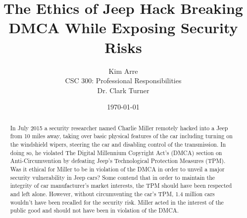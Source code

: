\documentclass[12pt]{article}
\begin{document}

\title{\vfill The Ethics of Jeep Hack Breaking DMCA While Exposing Security Risks} %
\author{
  Kim Arre \vspace{10pt} \\
  CSC 300: Professional Responsibilities  \vspace{10pt} \\
  Dr. Clark Turner \vspace{10pt} \\
}
\date{\today}

\maketitle

\vfill  %
\begin{abstract}
In July 2015 a security researcher named Charlie Miller remotely hacked into a Jeep from 10 miles away, taking over basic physical features of the car including turning on the windshield wipers, steering the car and disabling control of the transmission. In doing so, he violated The Digital Millennium Copyright Act's (DMCA) section on Anti-Circumvention by defeating Jeep's Technological Protection Measures (TPM). Was it ethical for Miller to be in violation of the DMCA in order to unveil a major security vulnerability in Jeep cars? Some contend that in order to maintain the integrity of car manufacturer's market interests, the TPM should have been respected and left alone. However, without circumventing the car's TPM, 1.4 million cars wouldn't have been recalled for the security risk. Miller acted in the interest of the public good and should not have been in violation of the DMCA.
\end{abstract}

\thispagestyle{empty} %
\newpage
\end{document}
